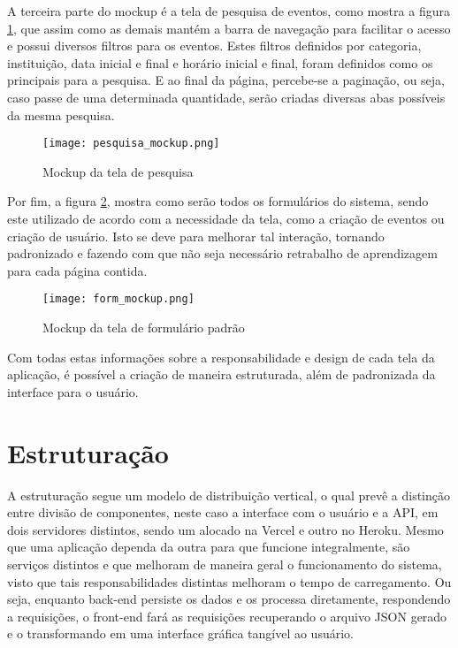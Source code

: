A terceira parte do mockup é a tela de pesquisa de eventos, como mostra a figura \ref{pesquisa_mockup}, que assim como as demais mantém a barra de navegação para facilitar o acesso e possui diversos filtros para os eventos. Estes filtros definidos por categoria, instituição, data inicial e final e horário inicial e final, foram definidos como os principais para a pesquisa. E ao final da página, percebe-se a paginação, ou seja, caso passe de uma determinada quantidade, serão criadas diversas abas possíveis da mesma pesquisa.
\begin{figure}[h]
    \caption{\label{pesquisa_mockup}Mockup da tela de pesquisa}
    \vspace{5pt}
    \centering
    \texttt{[image: pesquisa\_mockup.png]}
    \vspace{5pt}
\end{figure}

Por fim, a figura \ref{form_mockup}, mostra como serão todos os formulários do sistema, sendo este utilizado de acordo com a necessidade da tela, como a criação de eventos ou criação de usuário. Isto se deve para melhorar tal interação, tornando padronizado e fazendo com que não seja necessário retrabalho de aprendizagem para cada página contida.
\begin{figure}[h]
    \caption{\label{form_mockup}Mockup da tela de formulário padrão}
    \vspace{5pt}
    \centering
    \texttt{[image: form\_mockup.png]}
    \vspace{5pt}
\end{figure}

Com todas estas informações sobre a responsabilidade e design de cada tela da aplicação, é possível a criação de maneira estruturada, além de padronizada da interface para o usuário. 

\section{Estruturação}
A estruturação segue um modelo de distribuição vertical, o qual prevê a distinção entre divisão de componentes, neste caso a interface com o usuário e a API, em dois servidores distintos, sendo um alocado na Vercel e outro no Heroku. Mesmo que uma aplicação dependa da outra para que funcione integralmente, são serviços distintos e que melhoram de maneira geral o funcionamento do sistema, visto que tais responsabilidades distintas melhoram o tempo de carregamento. Ou seja, enquanto back-end persiste os dados e os processa diretamente, respondendo a requisições, o front-end fará as requisições recuperando o arquivo JSON gerado e o transformando em uma interface gráfica tangível ao usuário.


